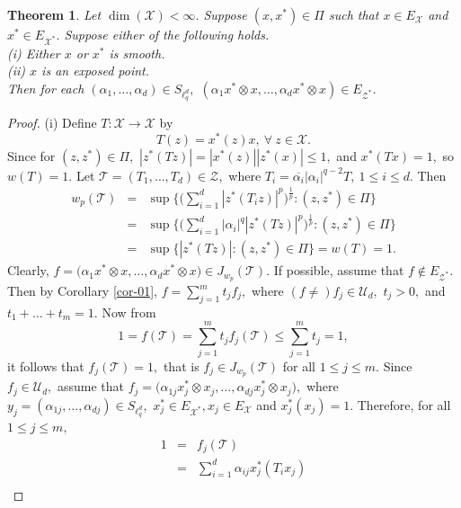 \documentclass{amsart}
\newtheorem{theorem}{Theorem}[section]
\theoremstyle{definition}
\theoremstyle{remark}
\numberwithin{equation}{section}
\begin{document}
\begin{theorem}\label{th-05}
		Let $\dim(\mathcal{X})<\infty.$ Suppose $(x,x^*)\in \Pi$ such that $x\in E_{\mathcal{X}}$ and $x^*\in E_{\mathcal{X}^*}.$ Suppose either of the following holds.\\
		\rm(i) Either $x$ or $x^*$ is smooth.\\
		\rm(ii) $x$ is an exposed point. \\
		Then for each $(\alpha_1,\ldots,\alpha_d)\in S_{\ell_q^d},$  $(\alpha_1x^*\otimes x,\ldots,\alpha_dx^*\otimes x)\in E_{\mathcal{Z}^*}.$
	\end{theorem}
\begin{proof}
(i)	 Define $T:\mathcal{X}\to \mathcal{X}$ by 
	\[T(z)=x^*(z) x, ~\forall~z\in \mathcal{X}.\]
Since for $(z,z^*)\in \Pi,$ $|z^*(Tz)|=|x^*(z)||z^*(x)|\leq 1,$ and $x^*(Tx)=1,$ so $w(T)=1.$
Let $\mathcal{T}=(T_1,\ldots,T_d)\in \mathcal{Z},$ where $T_i=\overline{\alpha_i}|\alpha_i|^{q-2}T, ~1\leq i\leq d.$ Then 
\begin{eqnarray*}
w_p(\mathcal{T})&=&\sup\Big\{\Big(\sum_{i=1}^d|z^*(T_iz)|^p\Big)^\frac{1}{p}:(z,z^*)\in \Pi\Big\}\\	
&=& \sup\Big\{\Big(\sum_{i=1}^d|\alpha_i|^q|z^*(Tz)|^p\Big)^\frac{1}{p}:(z,z^*)\in \Pi\Big\}\\
&=& \sup\Big\{|z^*(Tz)|:(z,z^*)\in \Pi\Big\}=w(T)=1.
\end{eqnarray*}
Clearly, $f=\Big(\alpha_1x^*\otimes x,\ldots,\alpha_dx^*\otimes x \Big)\in J_{w_p}(\mathcal{T}).$ If possible, assume that $f\notin E_{\mathcal{Z}^*}.$ Then by Corollary \ref{cor-01}, $f=\sum_{j=1}^mt_jf_j,$ where $(f\neq ) f_j\in \mathcal{U}_d,$ $t_j>0,$ and $t_1+\ldots+t_m=1.$ Now from
\[1=f(\mathcal{T})=\sum_{j=1}^mt_jf_j(\mathcal{T})\leq \sum_{j=1}^mt_j=1,\]
it follows that $f_j(\mathcal{T})=1,$ that is $f_j\in J_{w_p}(\mathcal{T})$ for all $1\leq j\leq m.$  Since $f_j\in \mathcal{U}_d,$ assume that $f_j=\bigg(\alpha_{1j}x_j^*\otimes x_j,\ldots,\alpha_{dj}x_j^*\otimes x_j\bigg),$ where $y_j=(\alpha_{1j},\ldots,\alpha_{dj})\in S_{\ell_q^d},$  $x_j^*\in E_{\mathcal{X}^*},  x_j\in E_{\mathcal{X}}$ and $x_j^*(x_j)=1.$ Therefore, for all $1\leq j\leq m,$
\begin{eqnarray*}
1&=&f_j(\mathcal{T})	\\
&=&\sum_{i=1}^d\alpha_{ij}x_j^*(T_ix_j)\\

\end{eqnarray*}
\end{proof}
\end{document}
